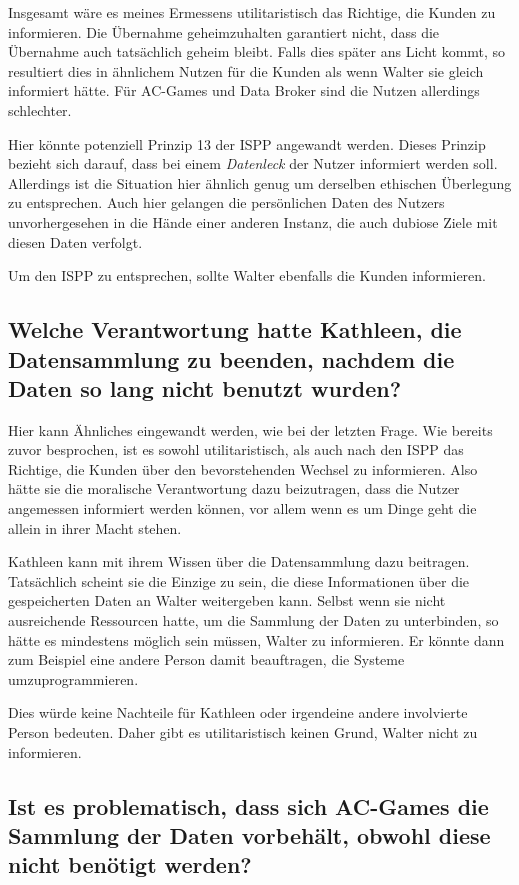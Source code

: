 Insgesamt wäre es meines Ermessens utilitaristisch das Richtige, die Kunden zu informieren.
Die Übernahme geheimzuhalten garantiert nicht, dass die Übernahme auch tatsächlich geheim bleibt.
Falls dies später ans Licht kommt, so resultiert dies in ähnlichem Nutzen für die Kunden als wenn Walter sie gleich informiert hätte.
Für AC-Games und Data Broker sind die Nutzen allerdings schlechter.

Hier könnte potenziell Prinzip 13 der ISPP angewandt werden. Dieses Prinzip bezieht sich darauf, dass bei einem \emph{Datenleck} der Nutzer informiert werden soll. Allerdings ist die Situation hier ähnlich genug um derselben ethischen Überlegung zu entsprechen.
Auch hier gelangen die persönlichen Daten des Nutzers unvorhergesehen in die Hände einer anderen Instanz, die auch dubiose Ziele mit diesen Daten verfolgt.

Um den ISPP zu entsprechen, sollte Walter ebenfalls die Kunden informieren.

\subsection*{Welche Verantwortung hatte Kathleen, die Datensammlung zu beenden, nachdem die Daten so lang nicht benutzt wurden? \cite{kees_faites_2017}}

Hier kann Ähnliches eingewandt werden, wie bei der letzten Frage.
Wie bereits zuvor besprochen, ist es sowohl utilitaristisch, als auch nach den ISPP das Richtige, die Kunden über den bevorstehenden Wechsel zu informieren.
Also hätte sie die moralische Verantwortung dazu beizutragen, dass die Nutzer angemessen informiert werden können, vor allem wenn es um Dinge geht die allein in ihrer Macht stehen.

Kathleen kann mit ihrem Wissen über die Datensammlung dazu beitragen.
Tatsächlich scheint sie die Einzige zu sein, die diese Informationen über die gespeicherten Daten an Walter weitergeben kann.
Selbst wenn sie nicht ausreichende Ressourcen hatte, um die Sammlung der Daten zu unterbinden, so hätte es mindestens möglich sein müssen, Walter zu informieren.
Er könnte dann zum Beispiel eine andere Person damit beauftragen, die Systeme umzuprogrammieren.

Dies würde keine Nachteile für Kathleen oder irgendeine andere involvierte Person bedeuten. 
Daher gibt es utilitaristisch keinen Grund, Walter nicht zu informieren.

\subsection{Ist es problematisch, dass sich AC-Games die Sammlung der Daten vorbehält, obwohl diese nicht benötigt werden?}

